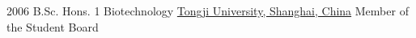 \documentclass[a4paper]{twentysecondcv} %
\begin{document}
		{2006 \hspace{5mm}}
        {B.Sc. Hons. 1 Biotechnology}
        {\href{http://en.tongji.edu.cn/}{Tongji University, Shanghai, China}}
        { }
        {
           Member of the Student Board
    	}





\end{document}
